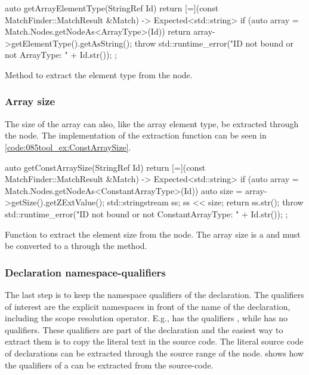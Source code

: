 \begin{listing}[H]
    \begin{cppcode}
auto getArrayElementType(StringRef Id) {
    return [=](const MatchFinder::MatchResult &Match) -> Expected<std::string> {
        if (auto array = Match.Nodes.getNodeAs<ArrayType>(Id)) {
            return array->getElementType().getAsString();
        }
        throw std::runtime_error("ID not bound or not ArrayType: " + Id.str());
    };
}
    \end{cppcode}
    \caption{Method to extract the element type from the  node.}
    \label{code:085tool_ex:ArrayElemtType}
\end{listing}

\subsubsection*{Array size}

The size of the array can also, like the array element type, be extracted through the  node. The implementation of the extraction function can be seen in \cref{code:085tool_ex:ConstArraySize}.

\begin{listing}[H]
    \begin{cppcode}
auto getConstArraySize(StringRef Id) {
    return [=](const MatchFinder::MatchResult &Match) -> Expected<std::string> {
        if (auto array = Match.Nodes.getNodeAs<ConstantArrayType>(Id)) {
            auto size = array->getSize().getZExtValue();
            std::stringstream ss;
            ss << size;
            return ss.str();
        }
        throw std::runtime_error("ID not bound or not ConstantArrayType: " + Id.str());
    };
}
    \end{cppcode}
    \caption{Function to extract the element size from the  node. The array size is a  and must be converted to a  through the  method.}
    \label{code:085tool_ex:ConstArraySize}
\end{listing}

\subsubsection*{Declaration namespace-qualifiers}

The last step is to keep the namespace qualifiers of the declaration. The qualifiers of interest are the explicit namespaces in front of the name of the declaration, including the scope resolution operator. E.g.,  has the qualifiers , while  has no qualifiers.
These qualifiers are part of the declaration and the easiest way to extract them is to copy the literal text in the source code. The literal source code of declarations can be extracted through the source range of the node.  shows how the qualifiers of a  can be extracted from the source-code.

